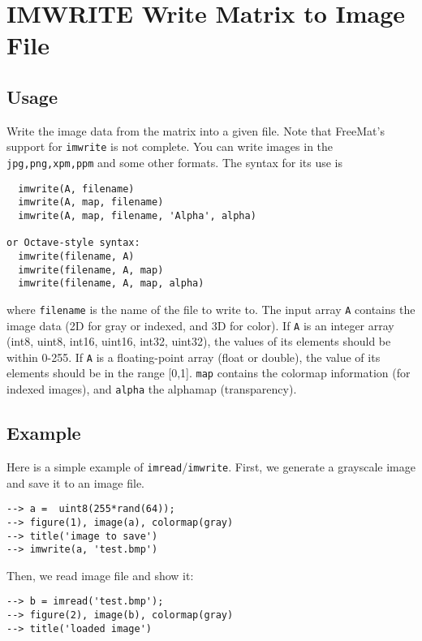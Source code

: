 \section{IMWRITE Write Matrix to Image File}

\subsection{Usage}

Write the image data from the matrix into a given file.  Note that
FreeMat's support for \verb|imwrite| is not complete.
You can write images in the \verb|jpg,png,xpm,ppm| and some other formats.
The syntax for its use is
\begin{verbatim}
  imwrite(A, filename)
  imwrite(A, map, filename)
  imwrite(A, map, filename, 'Alpha', alpha)

or Octave-style syntax:
  imwrite(filename, A)
  imwrite(filename, A, map)
  imwrite(filename, A, map, alpha)
\end{verbatim}
where \verb|filename| is the name of the file to write to.  The input array 
\verb|A| contains the image data (2D for gray or indexed, and 3D for color).  
If \verb|A| is an integer array (int8, uint8, int16, uint16, int32, uint32), 
the values of its elements should be within 0-255.  If \verb|A| is a 
floating-point array (float or double), the value of its elements should
be in the range [0,1].  \verb|map| contains the colormap information
(for indexed images), and \verb|alpha| the alphamap (transparency).
\subsection{Example}

Here is a simple example of \verb|imread|/\verb|imwrite|.  First, we generate
a grayscale image and save it to an image file.
\begin{verbatim}
--> a =  uint8(255*rand(64));
--> figure(1), image(a), colormap(gray)
--> title('image to save')
--> imwrite(a, 'test.bmp')
\end{verbatim}
Then, we read image file and show it:
\begin{verbatim}
--> b = imread('test.bmp');
--> figure(2), image(b), colormap(gray)
--> title('loaded image')
\end{verbatim}

